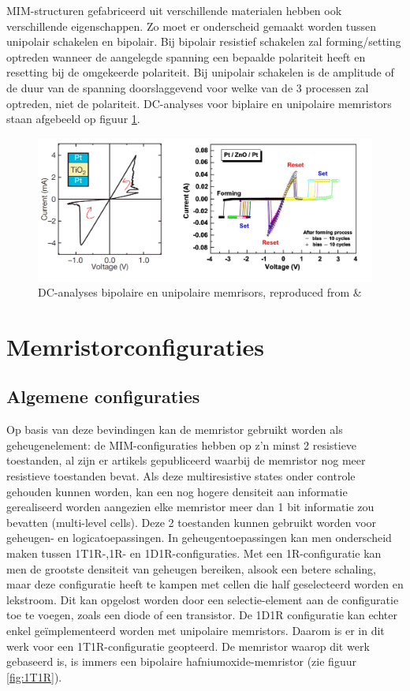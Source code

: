 MIM-structuren gefabriceerd uit verschillende materialen hebben ook verschillende eigenschappen. Zo moet er onderscheid gemaakt worden tussen unipolair schakelen en bipolair. Bij bipolair resistief schakelen zal forming/setting optreden wanneer de aangelegde spanning een bepaalde polariteit heeft en resetting bij de omgekeerde polariteit. Bij unipolair schakelen is de amplitude of de duur van de spanning doorslaggevend voor welke van de 3 processen zal optreden, niet de polariteit. DC-analyses voor biplaire en unipolaire memristors staan afgebeeld op figuur \ref{fig:bipolar-unipolar}.

\begin{figure}
  \centering
  \includegraphics[scale=0.27]{../fig/hfdstk-cel-bipolar-unipolar.png}
  \caption[DC-analyse bipolaire/unipolaire memristor]{DC-analyses bipolaire en unipolaire memrisors, reproduced from \cite{Str08} \& \cite{Cha08}}
  \label{fig:bipolar-unipolar}
\end{figure}


\section{Memristorconfiguraties}

\subsection{Algemene configuraties}
Op basis van deze bevindingen kan de memristor gebruikt worden als geheugenelement: de MIM-configuraties hebben op z'n minst 2 resistieve toestanden, al zijn er artikels gepubliceerd waarbij de memristor nog meer resistieve toestanden bevat\cite{Liu12}. Als deze multiresistive states onder controle gehouden kunnen worden, kan een nog hogere densiteit aan informatie gerealiseerd worden aangezien elke memristor meer dan 1 bit informatie zou bevatten (multi-level cells).
Deze 2 toestanden kunnen gebruikt worden voor geheugen- en logicatoepassingen\cite{ros12}\cite{raj09}. In geheugentoepassingen kan men onderscheid maken tussen 1T1R-,1R- en 1D1R-configuraties\cite{Den13}. Met een 1R-configuratie kan men de grootste densiteit van geheugen bereiken, alsook een betere schaling, maar deze configuratie heeft te kampen met cellen die half geselecteerd worden en lekstroom. Dit kan opgelost worden door een selectie-element aan de configuratie toe te voegen, zoals een diode of een transistor. De 1D1R configuratie kan echter enkel geïmplementeerd worden met unipolaire memristors\cite{Wou09}. Daarom is er in dit werk voor een 1T1R-configuratie geopteerd. De memristor waarop dit werk gebaseerd is, is immers een bipolaire hafniumoxide-memristor (zie figuur \ref{fig:1T1R}).


